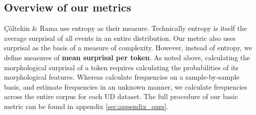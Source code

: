 \documentclass[USenglish]{article}
\begin{document}
\subsection{Overview of our metrics}
\label{detailed_procedure}
Çöltekin \& Rama use entropy as their measure.
Technically entropy is itself the average surprisal of all events in an entire distribution.
Our metric also uses surprisal as the basis of a measure of complexity.
However, instead of entropy, we define measures of \textbf{mean surprisal per token}.
As noted above, calculating the morphological surprisal of a token requires calculating the probabilities of its morphological features.
Whereas \citet{ccoltekin2023complexity} calculate frequencies on a sample-by-sample basis, and \citet{SPROAT14.47} estimate frequencies in an unknown manner, we calculate frequencies across the entire corpus for each UD dataset.
The full procedure of our basic metric can be found in appendix \ref{sec:appendix_ours}.

\end{document}
